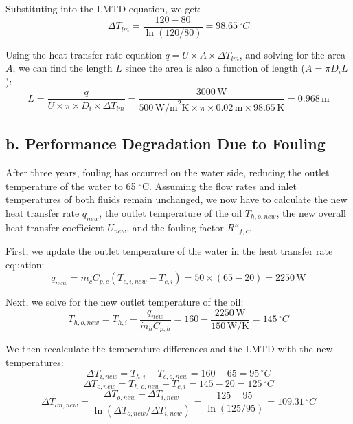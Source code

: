 \documentclass{article}
\begin{document}
Substituting into the LMTD equation, we get:
\begin{equation}
\Delta T_{lm} = \frac{120 - 80}{\ln(120/80)} = 98.65 \, ^{\circ}C
\end{equation}

Using the heat transfer rate equation \( q = U \times A \times \Delta T_{lm} \), and solving for the area \( A \), we can find the length \( L \) since the area is also a function of length (\( A = \pi D_i L \)):
\begin{equation}
L = \frac{q}{U \times \pi \times D_{i} \times \Delta T_{lm}} = \frac{3000 \, \text{W}}{500 \, \text{W/m}^2 \text{K} \times \pi \times 0.02 \, \text{m} \times 98.65 \, \text{K}} = 0.968 \, \text{m}
\end{equation}

\subsection*{b. Performance Degradation Due to Fouling}

After three years, fouling has occurred on the water side, reducing the outlet temperature of the water to 65 \( ^{\circ}\)C. Assuming the flow rates and inlet temperatures of both fluids remain unchanged, we now have to calculate the new heat transfer rate \( q_{new} \), the outlet temperature of the oil \( T_{h,o,new} \), the new overall heat transfer coefficient \( U_{new} \), and the fouling factor \( R''_{f,c} \).

First, we update the outlet temperature of the water in the heat transfer rate equation:
\begin{equation}
q_{new} = \dot{m}_{c} C_{p,c} (T_{c,i,new} - T_{c,i}) = 50 \times (65 - 20) = 2250 \, \text{W}
\end{equation}

Next, we solve for the new outlet temperature of the oil:
\begin{equation}
T_{h,o,new} = T_{h,i} - \frac{q_{new}}{\dot{m}_{h} C_{p,h}} = 160 - \frac{2250 \, \text{W}}{150 \, \text{W/K}} = 145 \, ^{\circ}C
\end{equation}

We then recalculate the temperature differences and the LMTD with the new temperatures:
\begin{equation}
\Delta T_{i,new} = T_{h,i} - T_{c,o,new} = 160 - 65 = 95 \, ^{\circ}C
\end{equation}
\begin{equation}
\Delta T_{o,new} = T_{h,o,new} - T_{c,i} = 145 - 20 = 125 \, ^{\circ}C
\end{equation}
\begin{equation}
\Delta T_{lm,new} = \frac{\Delta T_{o,new} - \Delta T_{i,new}}{\ln(\Delta T_{o,new}/\Delta T_{i,new})} = \frac{125 - 95}{\ln(125/95)} = 109.31 \, ^{\circ}C
\end{equation}
\end{document}
